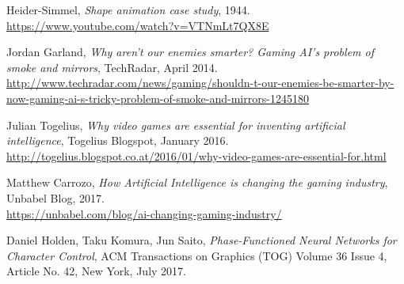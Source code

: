 \documentclass[a4paper]{article}
\begin{document}
\begin{thebibliography}{1}

  Heider-Simmel, \emph{Shape animation case study}, 1944.\\
  \url{https://www.youtube.com/watch?v=VTNmLt7QX8E}

  Jordan Garland, \emph{Why aren't our enemies smarter? Gaming AI's problem of smoke and mirrors}, TechRadar, April 2014.\\
  \url{http://www.techradar.com/news/gaming/shouldn-t-our-enemies-be-smarter-by-now-gaming-ai-s-tricky-problem-of-smoke-and-mirrors-1245180}

  Julian Togelius, \emph{Why video games are essential for inventing artificial intelligence}, Togelius Blogspot, January 2016.\\
  \url{http://togelius.blogspot.co.at/2016/01/why-video-games-are-essential-for.html}

  Matthew Carrozo, \emph{How Artificial Intelligence is changing the gaming industry}, Unbabel Blog, 2017.\\
  \url{https://unbabel.com/blog/ai-changing-gaming-industry/}

  Daniel Holden, Taku Komura, Jun Saito, \emph{Phase-Functioned Neural Networks for Character Control}, ACM Transactions on Graphics (TOG) Volume 36 Issue 4, Article No. 42, New York, July 2017.

\end{thebibliography}
\end{document}
